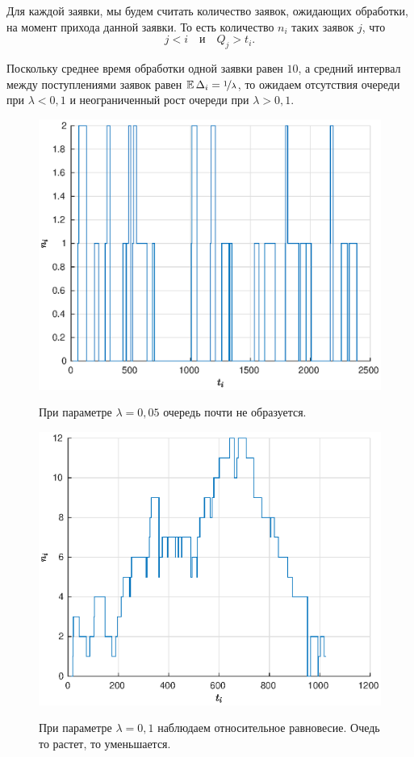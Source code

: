 Для каждой заявки, мы будем считать количество заявок, ожидающих обработки, на момент прихода данной заявки. То есть количество $n_i$ таких заявок $j$, что
$$
        j < i
        \quad
        \mbox{и}
        \quad
        Q_j > t_i.
$$

Поскольку среднее время обработки одной заявки равен $10$, а средний интервал между поступлениями заявок равен $\mathbb{E}\,\Delta_i = \nicefrac{1}{\lambda}$, то ожидаем отсутствия очереди при $\lambda < 0,\!1$ и неограниченный рост очереди при $\lambda > 0,\!1$.

\clearpage
\begin{figure}[t]
        \noindent
        \centering
        {
        \includegraphics[width=120mm]{task_11/1-l-0-05.eps}}
        \caption{При параметре $\lambda = 0,\!05$ очередь почти не образуется.} 
\end{figure}
\begin{figure}[b]
\noindent
        \centering
        {
        \includegraphics[width=120mm]{task_11/1-l-0-1.eps}}
        \caption{При параметре $\lambda = 0,\!1$ наблюдаем относительное равновесие. Очедь то растет, то уменьшается.}
\end{figure}
